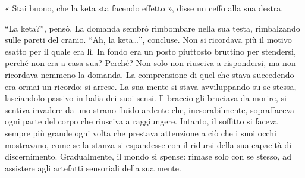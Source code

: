 « Stai buono, che la keta sta facendo effetto », disse un ceffo alla sua destra.

``La keta?'', pensò. La domanda sembrò rimbombare nella sua testa, rimbalzando sulle pareti del cranio. ``Ah, la keta\ldots'', concluse. Non si ricordava più il motivo esatto per il quale era lì. In fondo era un posto piuttosto bruttino per stendersi, perché non era a casa sua? Perché? Non solo non riusciva a rispondersi, ma non ricordava nemmeno la domanda. La comprensione di quel che stava succedendo era ormai un ricordo: si arrese. La sua mente si stava avviluppando su se stessa, lasciandolo passivo in balia dei suoi sensi. Il braccio gli bruciava da morire, si sentiva invadere da uno strano fluido ardente che, inesorabilmente, sopraffaceva ogni parte del corpo che riusciva a raggiungere. Intanto, il soffitto si faceva sempre più grande ogni volta che prestava attenzione a ciò che i suoi occhi mostravano, come se la stanza si espandesse con il ridursi della sua capacità di discernimento. Gradualmente, il mondo si spense: rimase solo con se stesso, ad assistere agli artefatti sensoriali della sua mente.
